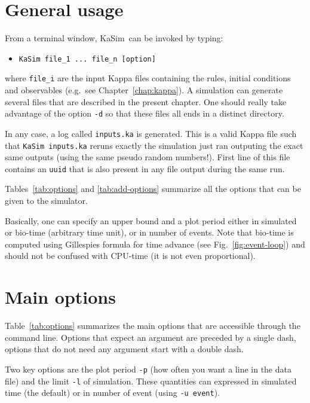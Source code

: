 \documentclass[11pt]{book}
\def\KaSim{\textsf{KaSim}}
\def\ttt#1{\texttt{#1}}
\def\eg{e.g.~}
\def\ITE#1{\begin{itemize}#1\end{itemize}}
\begin{document}
\section{General usage}
From a terminal window, \KaSim~can be invoked by typing:
\ITE{
\item[\$] \ttt{KaSim file\_1 ... file\_n [option] } } where
\ttt{file\_i} are the input Kappa files containing the rules, initial
conditions and observables ({\eg}see Chapter~\ref{chap:kappa}). A
simulation can generate several files that are described in the present chapter. One
should really take advantage of the option \ttt{-d} so that these files  all
ends in a distinct directory.

In any case, a log called \ttt{inputs.ka} is generated. This is a
valid Kappa file such that \ttt{KaSim inputs.ka} reruns exactly the
simulation just ran outputing the exact same outputs (using the same
pseudo random numbers!). First line of this file contains an \ttt{uuid}
that is also present in any file output during the same run.

Tables~\ref{tab:options} and \ref{tab:add-options} summarize all the
options that can be given to the simulator.

Basically, one can specify an upper bound and a plot period either in
simulated or bio-time (arbitrary time unit), or in number of events.
Note that bio-time is computed using
Gillespie{\textquotesingle}s formula for time advance (see
Fig.~\ref{fig:event-loop}) and should not be confused with CPU-time
(it is not even proportional).

\section{Main options}

Table~\ref{tab:options} summarizes the main options that are
accessible through the command line. Options that expect an argument
are preceded by a single dash, options that do not need any argument
start with a double dash.

Two key options are the plot period \ttt{-p} (how often you want a
line in the data file) and the limit \ttt{-l} of simulation. These
quantities can expressed in simulated time (the default) or in number
of event (using \ttt{-u event}).
\end{document}
